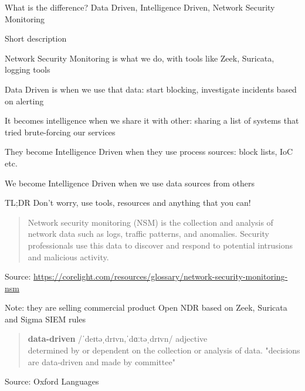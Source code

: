 \documentclass[Screen16to9,17pt]{foils}
\begin{document}

What is the difference? Data Driven, Intelligence Driven, Network Security Monitoring

Short description
\begin{list2}
\item Network Security Monitoring is what we do, with tools like Zeek, Suricata, logging tools
\item Data Driven is when we use that data: start blocking, investigate incidents based on alerting
\item It becomes intelligence when we share it with other: sharing a list of systems that tried brute-forcing our services
\item They become Intelligence Driven when they use process sources: block lists, IoC etc.
\item We become Intelligence Driven when we use data sources from others
\end{list2}

TL;DR Don't worry, use tools, resources and anything that you can!



\begin{quote}
Network security monitoring (NSM) is the collection and analysis of network data such as logs, traffic patterns, and anomalies. Security professionals use this data to discover and respond to potential intrusions and malicious activity.

\end{quote}
Source: \url{https://corelight.com/resources/glossary/network-security-monitoring-nsm}

\begin{list2}
\item Note: they are selling commercial product Open NDR based on Zeek, Suricata and Sigma SIEM rules
\end{list2}



\begin{quote}
{\large\bf  data-driven} /ˈdeɪtəˌdrɪvn,ˈdɑːtəˌdrɪvn/
adjective\\
determined by or dependent on the collection or analysis of data.
"decisions are data-driven and made by committee"
\end{quote}
Source:  Oxford Languages
\end{document}
